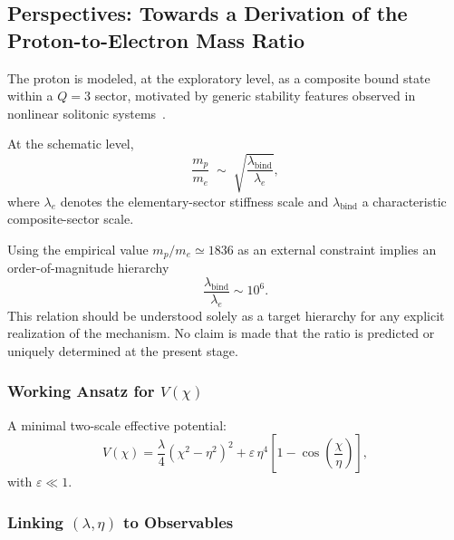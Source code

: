 \subsection{Perspectives: Towards a Derivation of the Proton-to-Electron Mass Ratio}
  \label{subsec:perspectives_mass_spectrum}

  The proton is modeled, at the exploratory level,
  as a composite bound state within a $Q=3$ sector,
  motivated by generic stability features observed
  in nonlinear solitonic systems~\cite{BattyeSutcliffe2022, MantonSutcliffe2004}.

  At the schematic level,
  \begin{equation}
    \frac{m_p}{m_e}
    \;\sim\;
    \sqrt{\frac{\lambda_{\mathrm{bind}}}{\lambda_e}},
  \end{equation}
  where $\lambda_e$ denotes the elementary-sector stiffness scale
  and $\lambda_{\mathrm{bind}}$ a characteristic composite-sector scale.

  Using the empirical value $m_p/m_e \simeq 1836$
  as an external constraint implies an order-of-magnitude hierarchy
  \begin{equation}
    \frac{\lambda_{\mathrm{bind}}}{\lambda_e}
    \sim 10^{6}.
  \end{equation}
  This relation should be understood solely as a target
  hierarchy for any explicit realization of the mechanism.
  No claim is made that the ratio is predicted
  or uniquely determined at the present stage.

  \subsubsection*{Working Ansatz for $V(\chi)$}
    \label{subsec:explicit_Vchi_ansatz}

    A minimal two-scale effective potential:
    \begin{equation}
      V(\chi)
      = \frac{\lambda}{4}
      (\chi^2 - \eta^2)^2
      + \varepsilon\,\eta^4
      \left[
        1 - \cos\!\left(
                    \frac{\chi}{\eta}
      \right)
      \right],
      \label{eq:Vchi_multiwell_periodic}
    \end{equation}
    with $\varepsilon \ll 1$.

  \subsubsection*{Linking $(\lambda,\eta)$ to Observables}
    \label{subsec:lambda_eta_to_observables}

